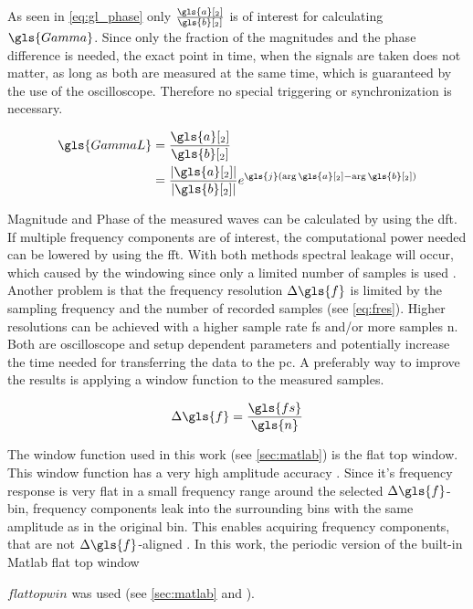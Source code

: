 \documentclass[12pt,a4paper,parskip=full,abstract=true,BCOR=12mm,twoside,open=right]{scrreprt}
\providecommand{\abs}[1]{\lvert#1\rvert}
\newcommand*{\SavedLstInline}{}
\DeclareRobustCommand*{\lstinline}{%
  \ifmmode
    \let\SavedBGroup\bgroup
    \def\bgroup{%
      \let\bgroup\SavedBGroup
      \hbox\bgroup
    }%
  \fi
  \SavedLstInline
}
\begin{document}
As seen in \cref{eq:gl_phase} only $\frac{\gls{a}[_2]}{\gls{b}[_2]}$ is
of interest for calculating $\gls{Gamma}$. Since only the fraction of the magnitudes
and the phase difference is needed, the exact point in time, when the signals are
taken does not matter, as long as both are measured at the same time, which is guaranteed
by the use of the oscilloscope. Therefore no special triggering or synchronization is necessary.

\begin{equation}\label{eq:gl_phase}
    \begin{split}
        \gls{GammaL} & = \frac{\gls{a}[_2]}{\gls{b}[_2]} \\
                     & = \frac{\abs{\gls{a}[_2]}}{\abs{\gls{b}[_2]}} e^{\gls{j}(\arg{\gls{a}[_2]}-\arg{\gls{b}[_2]})}
    \end{split}
\end{equation}

Magnitude and Phase of the measured waves can be calculated by using
the \gls{dft}. If multiple frequency components are of interest, the computational
power needed can be lowered by using the \gls{fft}. With both methods
spectral leakage will occur, which caused by the windowing since only a limited number of samples is used \cite{harris_use_1978}.
Another problem is that the frequency resolution $\Delta{}\gls{f}$ is limited by the sampling
frequency and the number of recorded samples (see \cref{eq:fres}). Higher resolutions
can be achieved with a higher sample rate \gls{fs} and/or more samples \gls{n}. Both are oscilloscope and setup
dependent parameters and potentially increase the time needed for transferring the data to the
\gls{pc}. A preferably way to improve the results is applying a window function to the
measured samples.

\begin{equation}
    \label{eq:fres} \Delta{}\gls{f} = \frac{\gls{fs}}{\gls{n}}
\end{equation}

The window function used in this work (see \cref{sec:matlab}) is the flat top window.
This window function has a very high amplitude accuracy \cite{heinzel_spectrum_2002}.
Since it's frequency response is very flat in a small frequency range around the selected $\Delta{}\gls{f}$-bin, frequency components leak
into the surrounding bins with the same amplitude as in the original bin. This enables acquiring frequency components, that are not $\Delta{}\gls{f}$-aligned \cite{heinzel_spectrum_2002}.
In this work, the periodic version of the built-in Matlab flat top window \lstinline$flattopwin$
was used (see \cref{sec:matlab} and \cite{matlab_flattop}).
\end{document}
